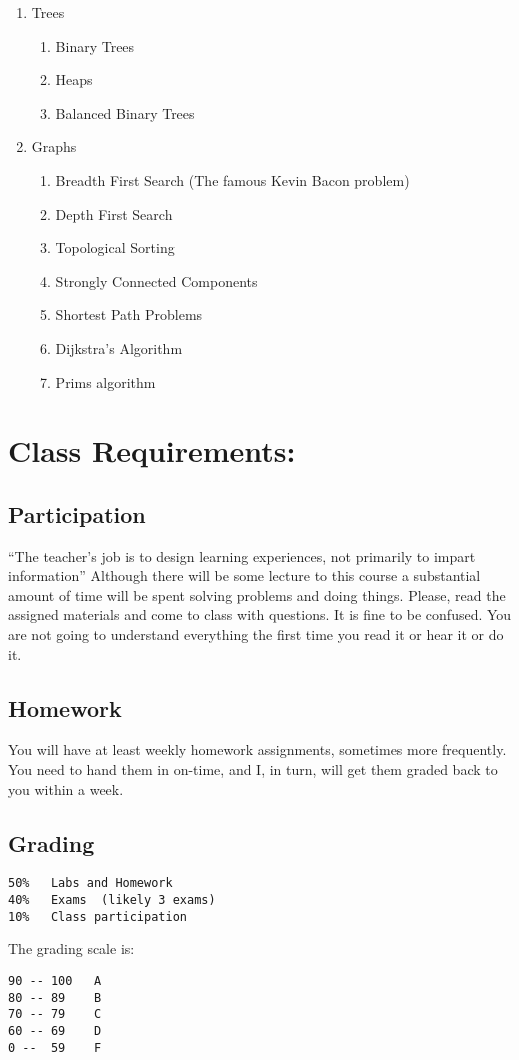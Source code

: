 \documentclass[11pt,twocolumn]{article}
\begin{document}
\begin{enumerate}
\begin{enumerate}
\end{enumerate}
    \item Trees

\begin{enumerate}
    \item Binary Trees
    \item Heaps
    \item Balanced Binary Trees

\end{enumerate}
    \item Graphs

\begin{enumerate}
    \item Breadth First Search  (The famous Kevin Bacon problem)
    \item Depth First Search
    \item Topological Sorting
    \item Strongly Connected Components
    \item Shortest Path Problems
    \item Dijkstra's Algorithm
    \item Prims algorithm

\end{enumerate}
\end{enumerate}
\section*{Class Requirements:}

\subsection*{Participation}

``The teacher's job is to design learning experiences, not primarily to impart information''  Although there will be some lecture to this course a substantial amount of time will be spent solving problems and doing things.  Please, read the assigned materials and come to class with questions.  It is fine to be confused. You are not going to understand everything the first time you read it or hear it or do it.

\subsection*{Homework}

You will have at least weekly homework assignments, sometimes more frequently.  You need to hand them in on-time, and I, in turn, will get them graded back to you within a week.

\subsection*{Grading}


\begin{verbatim}
50%   Labs and Homework
40%   Exams  (likely 3 exams)
10%   Class participation
\end{verbatim}

The grading scale is:

\begin{verbatim}
90 -- 100   A
80 -- 89    B
70 -- 79    C
60 -- 69    D
0 --  59    F
\end{verbatim}
\end{document}
